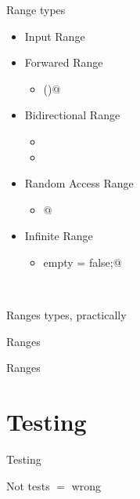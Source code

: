 \documentclass[aspectratio=169,notes]{beamer}
\begin{document}
	\begin{frame}[fragile]{Range types}
		\begin{itemize}
			\item Input Range
				\pause
			\item Forwared Range
			\begin{itemize}
				\item \lstinline@save()@
			\end{itemize}
			\item Bidirectional Range
			\begin{itemize}
				\item \lstinline@back@
				\item \lstinline@popBack@
			\end{itemize}
			\item Random Access Range
			\begin{itemize}
				\item \lstinline@[]@
			\end{itemize}
			\item Infinite Range
			\begin{itemize}
				\item \lstinline@enum empty = false;@
			\end{itemize}
		\end{itemize}\mbox{}\\[1cm]
	\end{frame}
	\begin{frame}[fragile]{Ranges types, practically}
		
	\end{frame}

	\begin{frame}[fragile]{Ranges}
		
	\end{frame}

	\begin{frame}[fragile]{Ranges}
		
	\end{frame}

	\section{Testing}
	\begin{frame}[fragile]{Testing}
		\begin{center}
		\Large Not tests $=$ wrong
		\end{center}
	\end{frame}
\end{document}
